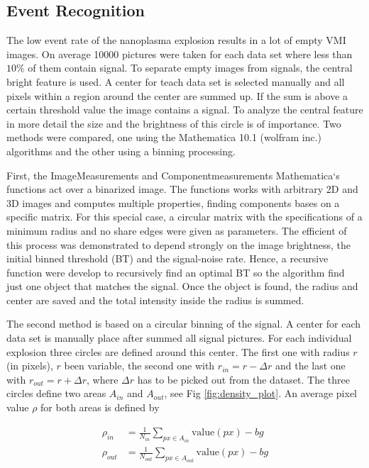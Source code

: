 \subsection{Event Recognition}

The low event rate of the nanoplasma explosion results in a lot of empty VMI images. On average 10000 pictures were taken for each data set where less than $10\%$ of them contain signal. To separate empty images from signals, the central bright feature is used. A center for teach data set is selected manually and all pixels within a region around the center are summed up. If the sum is above a certain threshold value the image contains a signal. To analyze the central feature in more detail the size and the brightness of this circle is of importance. Two methods were compared, one using the Mathematica 10.1 (wolfram inc.) algorithms and the other using a binning processing.

First, the ImageMeasurements and Componentmeasurements Mathematica`s functions act over a binarized image. The functions works with arbitrary 2D and 3D images and computes multiple properties, finding components bases on a specific matrix. For this special case, a circular matrix with the specifications of a minimum radius and no share edges were given as parameters. The efficient of this process was demonstrated to depend strongly on the image brightness, the initial binned threshold (BT) and the signal-noise rate. Hence, a recursive function were develop to recursively find an optimal BT so the algorithm find just one object that matches the signal. Once the object is found, the radius and center are saved and the total intensity inside the radius is summed. 

The second method is based on a circular binning of the signal. A center for each data set is manually place after summed all signal pictures. For each individual explosion three circles are defined around this center. The first one with radius $r$ (in pixels), $r$ been variable, the second one with $r_{in} = r-\Delta r$ and the last one with $r_{out} = r + \Delta r$, where $\Delta r$ has to be picked out from the dataset. The three circles define two areas $A_{in}$ and $A_{out}$, see Fig  \ref{fig:density_plot}. An average pixel value $\rho$ for both areas is defined by

\begin{align}
\rho_{in} & = \frac{1}{N_{in}} \sum_{px \in A_{in}} \text{value}(px) - bg \\
\rho_{out} & = \frac{1}{N_{out}} \sum_{px \in A_{out}} \text{value} (px) -bg \\
\end{align}

